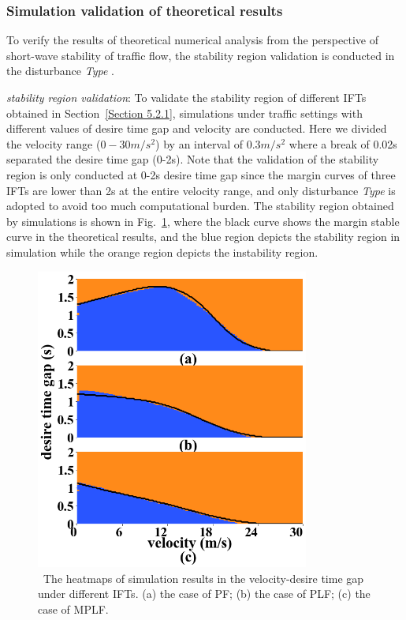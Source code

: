 \documentclass[journal]{IEEEtran}
\begin{document}
\subsubsection{Simulation validation of theoretical results}
\label{Section 5.2.3}


To verify the results of theoretical numerical analysis from the perspective of short-wave stability of traffic flow, the stability region validation is conducted in the disturbance \textit{Type \uppercase\expandafter{}}.


\textit{stability region validation}: To validate the stability region of different IFTs obtained in Section~\ref{Section 5.2.1}, simulations under traffic settings with different values of desire time gap and velocity are conducted. Here we divided the velocity range ($0-30 m/s^2$) by an interval of $0.3 m/s^2$ where a break of 0.02s separated the desire time gap (0-2s). Note that the validation of the stability region is only conducted at 0-2s desire time gap since the margin curves of three IFTs are lower than 2s at the entire velocity range, and only disturbance \textit{Type \uppercase\expandafter{}} is adopted to avoid too much computational burden. The stability region obtained by simulations is shown in Fig.~\ref{Figure5.2.3}, where the black curve shows the margin stable curve in the theoretical results, and the blue region depicts the stability region in simulation while the orange region depicts the instability region.


\begin{figure}
  \includegraphics[width=9cm]{figextend1.png}
  \caption{~The heatmaps of simulation results in the velocity-desire time gap under different IFTs. (a) the case of PF; (b) the case of PLF; (c) the case of MPLF.}
  \label{Figure5.2.3}
\end{figure}
\end{document}
